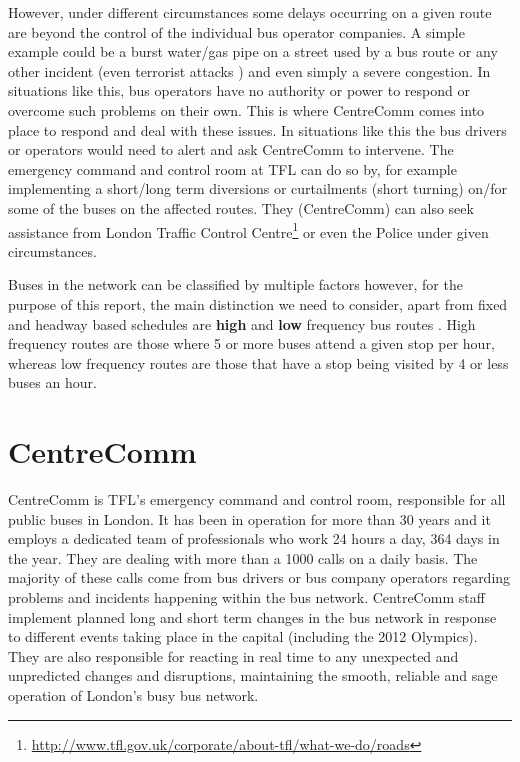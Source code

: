 However, under different circumstances some delays occurring on a given route are beyond the control of the individual bus operator companies. A simple example could be a burst water/gas pipe on a street used by a bus route or any other incident (even terrorist attacks \cite{centreComm}) and even simply a severe congestion. In situations like this, bus operators have no authority or power to respond or overcome such problems on their own. This is where CentreComm comes into place to respond and deal with these issues. In situations like this the bus drivers or operators would need to alert and ask CentreComm to intervene. The emergency command and control room at TFL can do so by, for example implementing a short/long term diversions or curtailments (short turning) on/for some of the buses on the affected routes. They (CentreComm) can also seek assistance from London Traffic Control Centre\footnote{\url{http://www.tfl.gov.uk/corporate/about-tfl/what-we-do/roads}} or even the Police under given circumstances.

Buses in the network can be classified by multiple factors however, for the purpose of this report, the main distinction we need to consider, apart from fixed and headway based schedules are \textbf{high} and \textbf{low} frequency bus routes \cite{busTendering}. High frequency routes are those where 5 or more buses attend a given stop per hour, whereas low frequency routes are those that have a stop being visited by 4 or less buses an hour.

\section{CentreComm}
CentreComm is TFL's emergency command and control room, responsible for all public buses in London. It has been in operation for more than 30 years \cite{centreComm} and it employs a dedicated team of professionals who work 24 hours a day, 364 days in the year. They are dealing with more than a 1000 calls on a daily basis. The majority of these calls come from bus drivers or bus company operators regarding problems and incidents happening within the bus network. CentreComm staff implement planned long and short term changes in the bus network in response to different events taking place in the capital (including the 2012 Olympics). They are also responsible for reacting in real time to any unexpected and unpredicted changes and disruptions, maintaining the smooth, reliable and sage operation of London's busy bus network.


